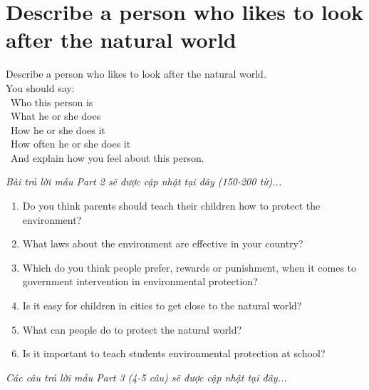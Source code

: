 \section{Describe a person who likes to look after the natural world}
\begin{ieltsprompt}
Describe a person who likes to look after the natural world. \\
You should say: \\
\textbullet\ Who this person is \\
\textbullet\ What he or she does \\
\textbullet\ How he or she does it \\
\textbullet\ How often he or she does it \\
\textbullet\ And explain how you feel about this person. \\
\end{ieltsprompt}

\vspace{1em}
\textit{Bài trả lời mẫu Part 2 sẽ được cập nhật tại đây (150-200 từ)...}
\vspace{2em}

\begin{ieltsprompt}
\begin{enumerate}[itemsep=4pt]
    \item Do you think parents should teach their children how to protect the environment?
    \item What laws about the environment are effective in your country?
    \item Which do you think people prefer, rewards or punishment, when it comes to government intervention in environmental protection?
    \item Is it easy for children in cities to get close to the natural world?
    \item What can people do to protect the natural world?
    \item Is it important to teach students environmental protection at school?
\end{enumerate}
\end{ieltsprompt}

\vspace{1em}
\textit{Các câu trả lời mẫu Part 3 (4-5 câu) sẽ được cập nhật tại đây...}
\vspace{2em}

